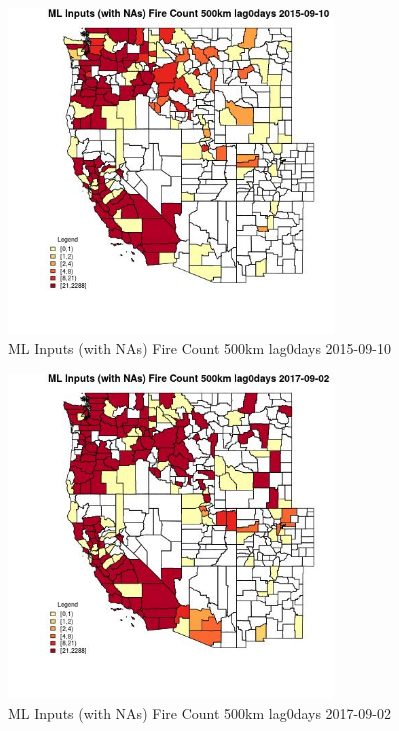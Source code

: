 \begin{figure} 
\centering  
\includegraphics[width=0.77\textwidth]{Code_Outputs/Report_ML_input_PM25_Step4_part_e_de_duplicated_aves_compiled_2019-05-21wNAs_CountyFire_Count_500km_lag0daysMean2015-09-10.jpg} 
\caption{\label{fig:Report_ML_input_PM25_Step4_part_e_de_duplicated_aves_compiled_2019-05-21wNAsCountyFire_Count_500km_lag0daysMean2015-09-10}ML Inputs (with NAs) Fire Count 500km lag0days 2015-09-10} 
\end{figure} 
 

\begin{figure} 
\centering  
\includegraphics[width=0.77\textwidth]{Code_Outputs/Report_ML_input_PM25_Step4_part_e_de_duplicated_aves_compiled_2019-05-21wNAs_CountyFire_Count_500km_lag0daysMean2017-09-02.jpg} 
\caption{\label{fig:Report_ML_input_PM25_Step4_part_e_de_duplicated_aves_compiled_2019-05-21wNAsCountyFire_Count_500km_lag0daysMean2017-09-02}ML Inputs (with NAs) Fire Count 500km lag0days 2017-09-02} 
\end{figure} 
 

